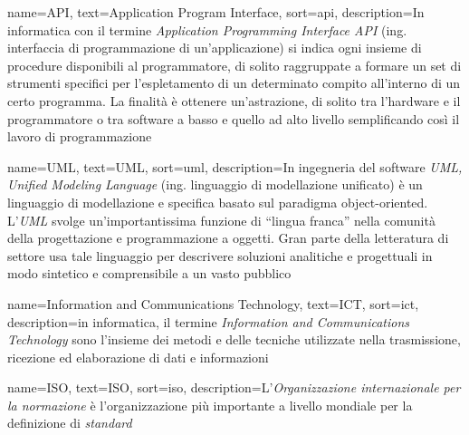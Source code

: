 








{
    name=API,
    text=Application Program Interface,
    sort=api,
    description={In informatica con il termine \emph{Application Programming Interface API} (ing. interfaccia di programmazione di un'applicazione) si indica ogni insieme di procedure disponibili al programmatore, di solito raggruppate a formare un set di strumenti specifici per l'espletamento di un determinato compito all'interno di un certo programma. La finalità è ottenere un'astrazione, di solito tra l'hardware e il programmatore o tra software a basso e quello ad alto livello semplificando così il lavoro di programmazione}
}

{
    name=UML,
    text=UML,
    sort=uml,
    description={In ingegneria del software \emph{UML, Unified Modeling Language} (ing. linguaggio di modellazione unificato) è un linguaggio di modellazione e specifica basato sul paradigma object-oriented. L'\emph{UML} svolge un'importantissima funzione di ``lingua franca'' nella comunità della progettazione e programmazione a oggetti. Gran parte della letteratura di settore usa tale linguaggio per descrivere soluzioni analitiche e progettuali in modo sintetico e comprensibile a un vasto pubblico}
}

{
    name=Information and Communications Technology,
    text=ICT,
    sort=ict,
    description={in informatica, il termine \emph{Information and Communications Technology} sono l'insieme dei metodi e delle tecniche utilizzate nella trasmissione, ricezione ed elaborazione di dati e informazioni}
}

{
    name=ISO,
    text=ISO,
    sort=iso,
    description={L'\emph{Organizzazione internazionale per la normazione} è l'organizzazione più importante a livello mondiale per la definizione di \textit{standard}}
}

